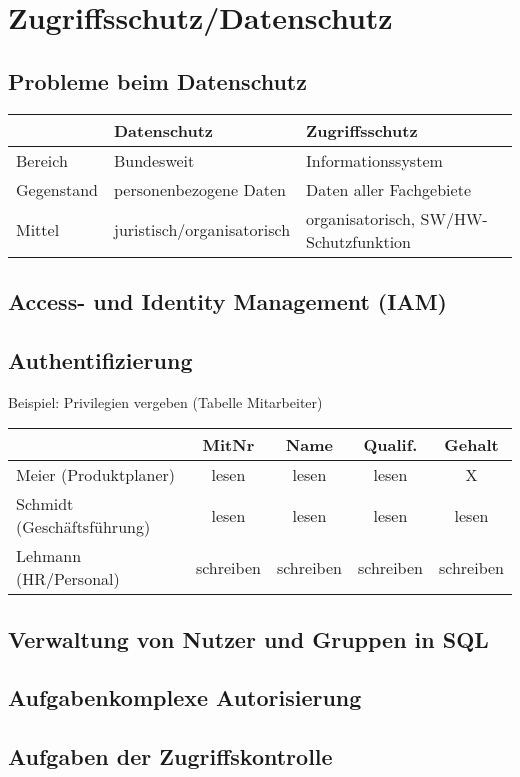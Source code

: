 \section{Zugriffsschutz/Datenschutz}
\subsection{Probleme beim Datenschutz}
\begin{tabular}{L{0.19} | L{0.4} L{0.4}}
& Datenschutz & Zugriffsschutz \\\hline
Bereich & Bundesweit & Informationssystem\\
Gegenstand & personenbezogene Daten & Daten aller Fachgebiete\\
Mittel & juristisch/organisatorisch & organisatorisch, SW/HW-Schutzfunktion
\end{tabular}

\subsection{Access- und Identity Management (IAM)}

\subsection{Authentifizierung}
Beispiel: Privilegien vergeben (Tabelle Mitarbeiter)\\
\begin{tabular}{l | c | c | c | c}
& MitNr & Name & Qualif. & Gehalt \\\hline
Meier (Produktplaner) & lesen & lesen & lesen & X\\
Schmidt (Geschäftsführung) & lesen & lesen & lesen & lesen\\
Lehmann (HR/Personal) & schreiben & schreiben & schreiben & schreiben
\end{tabular}

\subsection{Verwaltung von Nutzer und Gruppen in SQL}
\subsection{Aufgabenkomplexe Autorisierung}

\subsection{Aufgaben der Zugriffskontrolle}


